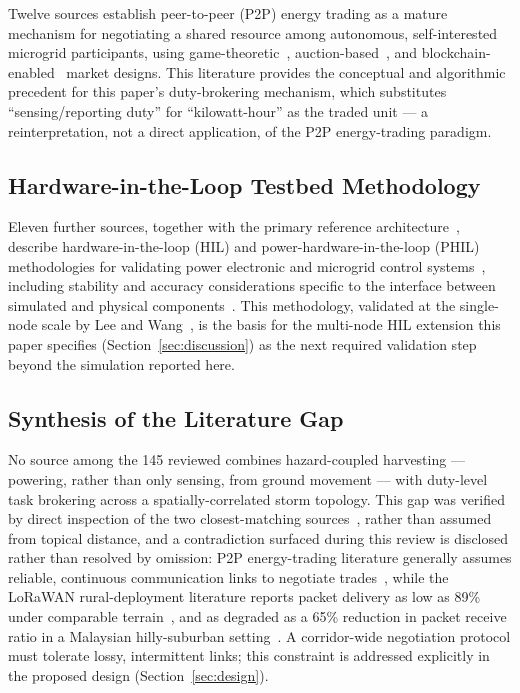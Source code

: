 \documentclass[electronics,article,submit,moreauthors]{Definitions/mdpi}
\begin{document}
Twelve sources establish peer-to-peer (P2P) energy trading as a mature mechanism for negotiating a shared resource among autonomous, self-interested microgrid participants, using game-theoretic~\cite{ref132,ref133}, auction-based~\cite{ref130}, and blockchain-enabled~\cite{ref136} market designs. This literature provides the conceptual and algorithmic precedent for this paper's duty-brokering mechanism, which substitutes ``sensing/reporting duty'' for ``kilowatt-hour'' as the traded unit --- a reinterpretation, not a direct application, of the P2P energy-trading paradigm.

\subsection{Hardware-in-the-Loop Testbed Methodology}

Eleven further sources, together with the primary reference architecture~\cite{ref101}, describe hardware-in-the-loop (HIL) and power-hardware-in-the-loop (PHIL) methodologies for validating power electronic and microgrid control systems~\cite{ref140,ref142,ref145,ref146}, including stability and accuracy considerations specific to the interface between simulated and physical components~\cite{ref140,ref149}. This methodology, validated at the single-node scale by Lee and Wang~\cite{ref101}, is the basis for the multi-node HIL extension this paper specifies (Section~\ref{sec:discussion}) as the next required validation step beyond the simulation reported here.

\subsection{Synthesis of the Literature Gap}

No source among the 145 reviewed combines hazard-coupled harvesting --- powering, rather than only sensing, from ground movement --- with duty-level task brokering across a spatially-correlated storm topology. This gap was verified by direct inspection of the two closest-matching sources~\cite{ref53,ref54}, rather than assumed from topical distance, and a contradiction surfaced during this review is disclosed rather than resolved by omission: P2P energy-trading literature generally assumes reliable, continuous communication links to negotiate trades~\cite{ref130,ref132}, while the LoRaWAN rural-deployment literature reports packet delivery as low as 89\% under comparable terrain~\cite{ref92}, and as degraded as a 65\% reduction in packet receive ratio in a Malaysian hilly-suburban setting~\cite{ref28}. A corridor-wide negotiation protocol must tolerate lossy, intermittent links; this constraint is addressed explicitly in the proposed design (Section~\ref{sec:design}).
\end{document}
